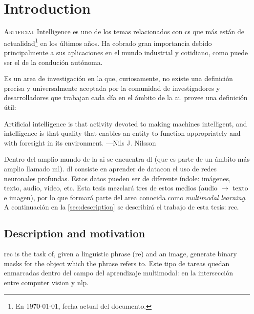 

\chapter{Introduction} \label{cha:intro}


\lettrine{A}{rtificial} Intelligence es uno de los temas relacionados con
\gls{cs} que más están de actualidad\footnote{En \today, fecha actual del
  documento.} en los últimos años. Ha cobrado gran importancia debido
principalmente a sus aplicaciones en el mundo industrial y cotidiano, como
puede ser el de la condución autónoma.

Es un area de investigación en la que, curiosamente, no existe una definición
precisa y universalmente aceptada por la comunidad de investigadores y
desarrolladores que trabajan cada día en el ámbito de la
\gls{ai}.  provee una definición útil:

\begin{quoteBox}
  Artificial intelligence is that activity devoted to making machines
  intelligent, and intelligence is that quality that enables an entity to
  function appropriately and with foresight in its environment.
  \tcblower
  ---Nils J. Nilsson
\end{quoteBox}

Dentro del amplio mundo de la \gls{ai} se encuentra \gls{dl} (que es parte de
un ámbito más amplio llamado \gls{ml}). \gls{dl} consiste en aprender de
datacon el uso de redes neuronales profundas. Estos datos pueden ser de
diferente índole: imágenes, texto, audio, video, etc. Esta tesis mezclará tres
de estos medios (audio \(\rightarrow\) texto e imagen), por lo que formará
parte del area conocida como \emph{multimodal learning}. A continuación en la
\vref{sec:description} se describirá el trabajo de esta tesis: \gls{rec}.


\section{Description and motivation} \label{sec:description}

\gls{rec} is the task of, given a linguistic phrase (\gls{re}) and an image,
generate binary masks for the object which the phrase refers to. Este tipo de
tareas quedan enmarcadas dentro del campo del aprendizaje multimodal: en la
intersección entre computer vision y \gls{nlp}.

